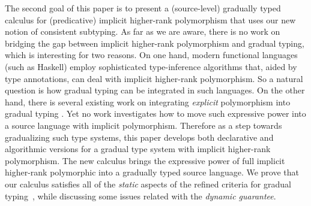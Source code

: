 \begin{comment}
To further validate our revised notion of consistent subtyping, we
show that it coincides with the notion of consistent subtyping for an
extension of Garcia et al.'s \emph{Abstracting Gradual Typing} (AGT)
(2016) with polymorphism.
\end{comment}

The second goal of this paper is to present a (source-level) gradually typed
calculus for (predicative) implicit higher-rank polymorphism that uses our new notion of
consistent subtyping. As far as we are aware, there is no work on bridging the
gap between implicit higher-rank polymorphism and gradual typing, which is interesting for
two reasons. On one hand, %
modern functional languages (such as Haskell) employ sophisticated type-inference algorithms that,
aided by type annotations, can deal with implicit higher-rank
polymorphism. So a natural question is how gradual typing can
be integrated in such languages.
On the other hand, there is several existing work on integrating
\textit{explicit} polymorphism into gradual typing
\citep{ahmed2011blame, yuu2017poly}. Yet no work investigates
how to move such expressive power into a source language with implicit
polymorphism. 
Therefore as a step towards gradualizing such type systems, this paper develops
both declarative and algorithmic versions for a gradual type system with
implicit higher-rank polymorphism. The new calculus brings the expressive power
of full implicit higher-rank polymorphic into a gradually typed source language.
We prove that our calculus satisfies all of the \textit{static} aspects of the
refined criteria for gradual typing~\cite{siek2015refined},
while discussing some issues related with the \textit{dynamic guarantee}.

